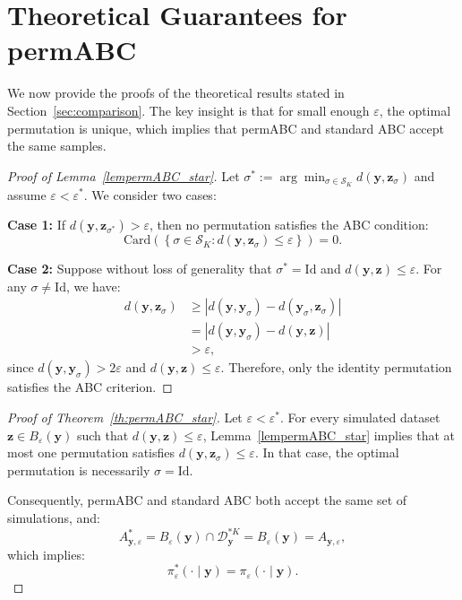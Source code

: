 \documentclass[11pt,a4paper]{article}
\def\dataspace{\mathcal{D}}
\def\obsdata{\mathbf{y}}
\def\simdata{\mathbf{z}}
\theoremstyle{plain}
\theoremstyle{definition}
\theoremstyle{remark}
\begin{document}
\section{Theoretical Guarantees for permABC}
\label{appendix_proofs}

We now provide the proofs of the theoretical results stated in Section~\ref{sec:comparison}. The key insight is that for small enough $\varepsilon$, the optimal permutation is unique, which implies that permABC and standard ABC accept the same samples.

\begin{proof}[Proof of Lemma~\ref{lempermABC_star}]
Let $\sigma^* := \arg\min_{\sigma \in \mathcal{S}_K} d(\obsdata, \simdata_{\sigma})$ and assume $\varepsilon < \varepsilon^*$. We consider two cases:

\textbf{Case 1:} If $d(\obsdata, \simdata_{\sigma^*}) > \varepsilon$, then no permutation satisfies the ABC condition:
\[
\mathrm{Card} \left( \left\{ \sigma \in \mathcal{S}_K : d(\obsdata, \simdata_{\sigma}) \leq \varepsilon \right\} \right) = 0.
\]

\textbf{Case 2:} Suppose without loss of generality that $\sigma^* = \mathrm{Id}$ and $d(\obsdata, \simdata) \leq \varepsilon$. For any $\sigma \neq \mathrm{Id}$, we have:
\[
\begin{aligned}
d(\obsdata, \simdata_{\sigma}) 
&\geq \left| d(\obsdata, \obsdata_{\sigma}) - d(\obsdata_{\sigma}, \simdata_{\sigma}) \right| \\
&= \left| d(\obsdata, \obsdata_{\sigma}) - d(\obsdata, \simdata) \right| \\
&> \varepsilon,
\end{aligned}
\]
since $d(\obsdata, \obsdata_{\sigma}) > 2\varepsilon$ and $d(\obsdata, \simdata) \leq \varepsilon$. Therefore, only the identity permutation satisfies the ABC criterion.
\end{proof}

\begin{proof}[Proof of Theorem~\ref{th:permABC_star}]
Let $\varepsilon < \varepsilon^*$. For every simulated dataset $\simdata \in B_\varepsilon(\obsdata)$ such that $d(\obsdata, \simdata) \leq \varepsilon$, Lemma~\ref{lempermABC_star} implies that at most one permutation satisfies $d(\obsdata, \simdata_{\sigma}) \leq \varepsilon$. In that case, the optimal permutation is necessarily $\sigma = \mathrm{Id}$.

Consequently, permABC and standard ABC both accept the same set of simulations, and:
\[
A^*_{\obsdata,\varepsilon} = B_{\varepsilon}(\obsdata) \cap \dataspace_{\obsdata}^{*K} = B_{\varepsilon}(\obsdata) = A_{\obsdata,\varepsilon},
\]
which implies:
\[
\pi^*_{\varepsilon}(\cdot \mid \obsdata) = \pi_{\varepsilon}(\cdot \mid \obsdata).
\]
\end{proof}
\end{document}
